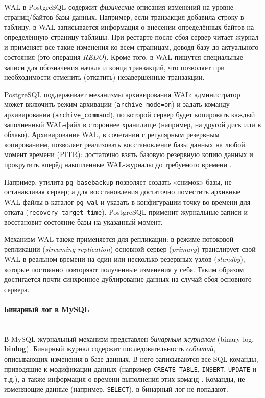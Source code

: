  WAL в PostgreSQL содержит \textit{физические} описания изменений на уровне страниц/байтов базы данных. Например, если транзакция добавила строку в таблицу, в WAL записывается информация о внесении определённых байтов на определённую страницу таблицы. При рестарте после сбоя сервер читает журнал и применяет все такие изменения ко всем страницам, доводя базу до актуального состояния (это операция \textit{REDO}). Кроме того, в WAL пишутся специальные записи для обозначения начала и конца транзакций, что позволяет при необходимости отменить (откатить) незавершённые транзакции. 
 
 PostgreSQL поддерживает механизмы архивирования WAL: администратор может включить режим архивации (\texttt{archive\_mode=on}) и задать команду архивирования (\texttt{archive\_command}), по которой сервер будет копировать каждый заполненный WAL-файл в стороннее хранилище (например, на другой диск или в облако). Архивирование WAL, в сочетании с регулярным резервным копированием, позволяет реализовать восстановление базы данных на любой момент времени (PITR): достаточно взять базовую резервную копию данных и прокрутить вперёд накопленные WAL-журналы до требуемого времени \autocite{PostgreSQLdocc28}. 
 
 Например, утилита \texttt{pg\_basebackup} позволяет создать «снимок» базы, не останавливая сервер; а для восстановления достаточно поместить архивные WAL-файлы в каталог \texttt{pg\_wal} и указать в конфигурации точку во времени для отката (\texttt{recovery\_target\_time}). PostgreSQL применит журнальные записи и восстановит состояние базы на указанный момент. 
 
 Механизм WAL также применяется для репликации: в режиме потоковой репликации (\textit{streaming replication}) основной сервер (\textit{primary}) транслирует свой WAL в реальном времени на один или несколько резервных узлов (\textit{standby}), которые постоянно повторяют полученные изменения у себя. Таким образом достигается почти синхронное дублирование данных на случай сбоя основного сервера.

 \paragraph{Бинарный лог в MySQL} ~\\
 
 В MySQL журнальный механизм представлен \textit{бинарным журналом} (binary log, \textbf{binlog}). Бинарный журнал содержит последовательность \textit{событий}, описывающих изменения в базе данных. В него записываются все SQL-команды, приводящие к модификации данных (например \texttt{CREATE TABLE}, \texttt{INSERT}, \texttt{UPDATE} и т.д.), а также информация о времени выполнения этих команд \autocite{Mysqldoc7}. Команды, не изменяющие данные (например, \texttt{SELECT}), в бинарный лог не попадают.
 
